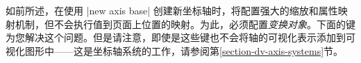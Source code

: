 
如前所述，在使用 |new axis base| 创建新坐标轴时，将配置强大的缩放和属性映射机制，但不会执行值到页面上位置的映射。为此，必须配置\emph{变换对象}。下面的键为您解决这个问题。但是请注意，即使是这些键也不会将轴的可视化表示添加到可视化图形中——这是坐标轴系统的工作，请参阅第\ref{section-dv-axis-systems}节。

